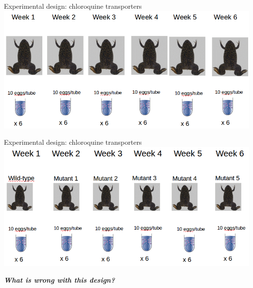 \documentclass[10pt]{beamer}
\begin{document}
\begin{frame}{Experimental design: chloroquine transporters}
 \includegraphics[width=\textwidth]{Figures/expdes1}
\end{frame}


\begin{frame}{Experimental design: chloroquine transporters}
 \includegraphics[width=\textwidth]{Figures/expdes2}
 \pause
 
 \emph{\textbf{What is wrong with this design?}}
\end{frame}
\end{document}
